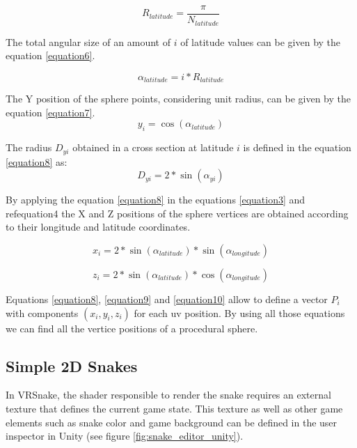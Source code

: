 \documentclass[runningheads]{llncs}
\begin{document}
\begin{equation}
R_{latitude} = \frac{\pi}{ N_{latitude}}
\label{equation5}
\end{equation}

The total angular size of an amount of $i$ of latitude values can be given by the equation \ref{equation6}.

\begin{equation}
\alpha_{latitude} = i * R_{latitude}
\label{equation6}
\end{equation}

The Y position of the sphere points, considering unit radius, can be given by the equation \ref{equation7}.
\begin{equation}
y_{i} = \cos(\alpha_{latitude})
\label{equation7}
\end{equation}

The radius $D_{yi}$ obtained in a cross section at latitude $i$ is defined in the equation \ref{equation8} as:
\begin{equation}
D_{yi} = 2 * \sin(\alpha_{yi})
\label{equation8}
\end{equation}

By applying the equation \ref{equation8} in the equations \ref{equation3} and ref{equation4} the X and Z positions of the sphere vertices are obtained according to their longitude and latitude coordinates.

\begin{equation}
x_{i} = 2 * \sin(\alpha_{latitude}) * \sin(\alpha_{longitude})
\label{equation9}
\end{equation}

\begin{equation}
z_{i} = 2 * \sin(\alpha_{latitude}) * \cos(\alpha_{longitude})
\label{equation10}
\end{equation}

Equations \ref{equation8}, \ref{equation9} and \ref{equation10} allow to define a vector $P_i$ with components $(x_i, y_i, z_i)$ for each uv position. By using all those equations we can find all the vertice positions of a procedural sphere.

\subsection{Simple 2D Snakes}
\label{subsec:2d-snakes}
In VRSnake, the shader responsible to render the snake requires an external texture that defines the current game state. This texture as well as other game elements such as snake color and game background can be defined in the user inspector in Unity (see figure \ref{fig:snake_editor_unity}).
\end{document}
